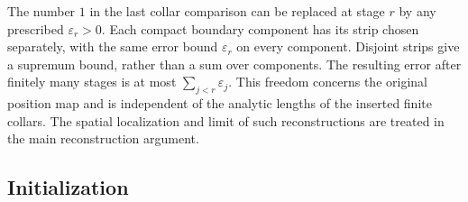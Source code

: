 \begin{remark}\label{component:small-displacement}
The number $1$ in the last collar comparison can be replaced at stage
$r$ by any prescribed $\varepsilon_r>0$.  Each compact boundary component
has its strip chosen separately, with the same error bound
$\varepsilon_r$ on every component.  Disjoint strips give a supremum
bound, rather than a sum over components.  The resulting error after
finitely many stages is at most $\sum_{j<r}\varepsilon_j$.
This freedom concerns the original position map and is independent
of the analytic lengths of the inserted finite collars.  The spatial
localization and limit of such reconstructions are treated in the
main reconstruction argument.
\end{remark}

\subsection{Initialization}

